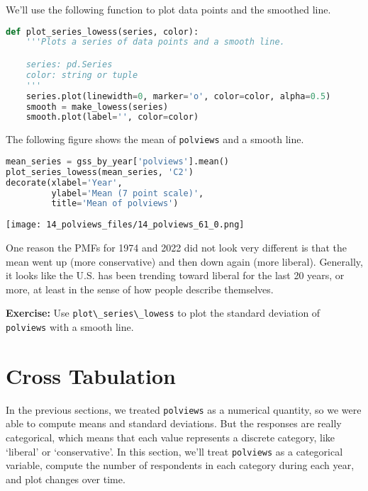 \pagebreak

We'll use the following function to plot data points and the smoothed
line.

\begin{lstlisting}[language=Python,style=source]
def plot_series_lowess(series, color):
    '''Plots a series of data points and a smooth line.

    series: pd.Series
    color: string or tuple
    '''
    series.plot(linewidth=0, marker='o', color=color, alpha=0.5)
    smooth = make_lowess(series)
    smooth.plot(label='', color=color)
\end{lstlisting}

The following figure shows the mean of
\passthrough{\lstinline!polviews!} and a smooth line.

\begin{lstlisting}[language=Python,style=source]
mean_series = gss_by_year['polviews'].mean()
plot_series_lowess(mean_series, 'C2')
decorate(xlabel='Year',
         ylabel='Mean (7 point scale)',
         title='Mean of polviews')
\end{lstlisting}

\begin{center}
\texttt{[image: 14\_polviews\_files/14\_polviews\_61\_0.png]}
\end{center}

One reason the PMFs for 1974 and 2022 did not look very different is
that the mean went up (more conservative) and then down again (more
liberal). Generally, it looks like the U.S. has been trending toward
liberal for the last 20 years, or more, at least in the sense of how
people describe themselves.

\textbf{Exercise:} Use \passthrough{\lstinline!plot\_series\_lowess!} to
plot the standard deviation of \passthrough{\lstinline!polviews!} with a
smooth line.

\pagebreak

\section{Cross Tabulation}\label{cross-tabulation}

In the previous sections, we treated \passthrough{\lstinline!polviews!}
as a numerical quantity, so we were able to compute means and standard
deviations. But the responses are really categorical, which means that
each value represents a discrete category, like `liberal' or
`conservative'. In this section, we'll treat
\passthrough{\lstinline!polviews!} as a categorical variable, compute
the number of respondents in each category during each year, and plot
changes over time.


